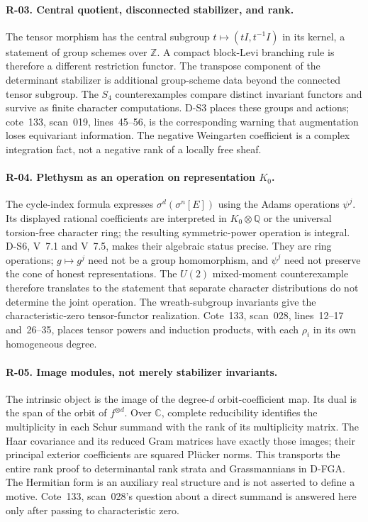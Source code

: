 \paragraph{R-03. Central quotient, disconnected stabilizer, and rank.}
The tensor morphism has the central subgroup $t\mapsto(tI,t^{-1}I)$ in its kernel, a statement of group schemes over $\mathbb Z$. A compact block-Levi branching rule is therefore a different restriction functor. The transpose component of the determinant stabilizer is additional group-scheme data beyond the connected tensor subgroup. The $S_4$ counterexamples compare distinct invariant functors and survive as finite character computations. D-S3 places these groups and actions; cote~133, scan~019, lines~45--56, is the corresponding warning that augmentation loses equivariant information. The negative Weingarten coefficient is a complex integration fact, not a negative rank of a locally free sheaf.

\paragraph{R-04. Plethysm as an operation on representation $K_0$.}
The cycle-index formula expresses $\sigma^d(\sigma^n[E])$ using the Adams operations $\psi^j$. Its displayed rational coefficients are interpreted in $K_0\otimes\mathbb Q$ or the universal torsion-free character ring; the resulting symmetric-power operation is integral. D-S6, V~7.1 and V~7.5, makes their algebraic status precise. They are ring operations; $g\mapsto g^j$ need not be a group homomorphism, and $\psi^j$ need not preserve the cone of honest representations. The $U(2)$ mixed-moment counterexample therefore translates to the statement that separate character distributions do not determine the joint operation. The wreath-subgroup invariants give the characteristic-zero tensor-functor realization. Cote~133, scan~028, lines~12--17 and~26--35, places tensor powers and induction products, with each $\rho_i$ in its own homogeneous degree.

\paragraph{R-05. Image modules, not merely stabilizer invariants.}
The intrinsic object is the image of the degree-$d$ orbit-coefficient map. Its dual is the span of the orbit of $f^{\otimes d}$. Over $\mathbb C$, complete reducibility identifies the multiplicity in each Schur summand with the rank of its multiplicity matrix. The Haar covariance and its reduced Gram matrices have exactly those images; their principal exterior coefficients are squared Pl\"ucker norms. This transports the entire rank proof to determinantal rank strata and Grassmannians in D-FGA. The Hermitian form is an auxiliary real structure and is not asserted to define a motive. Cote~133, scan~028's question about a direct summand is answered here only after passing to characteristic zero.

